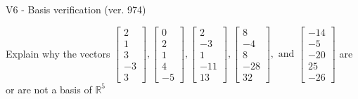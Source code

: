 \begin{exercise}
  \begin{exerciseTitle}V6 - Basis verification (ver. 974)\end{exerciseTitle}
  \begin{exerciseStatement}
    Explain why the vectors \(\left[\begin{array}{r}
2 \\
1 \\
3 \\
-3 \\
3
\end{array}\right] , \left[\begin{array}{r}
0 \\
2 \\
1 \\
4 \\
-5
\end{array}\right] , \left[\begin{array}{r}
2 \\
-3 \\
1 \\
-11 \\
13
\end{array}\right] , \left[\begin{array}{r}
8 \\
-4 \\
8 \\
-28 \\
32
\end{array}\right] , \text{ and } \left[\begin{array}{r}
-14 \\
-5 \\
-20 \\
25 \\
-26
\end{array}\right]\) are or are not a basis of \(\mathbb{R}^5\)	



\end{exerciseStatement}
\end{exercise}
